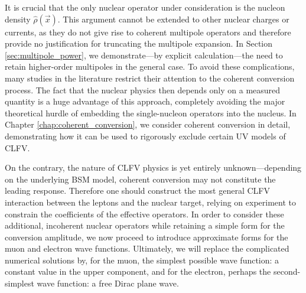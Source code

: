 \documentclass[12pt,letterpaper]{book}
\begin{document}
It is crucial that the only nuclear operator under consideration is the nucleon density $\hat{\rho}(\vec{x})$. This argument cannot be extended to other nuclear charges or currents, as they do not give rise to coherent multipole operators and therefore provide no justification for truncating the multipole expansion. In Section \ref{sec:multipole_power}, we demonstrate---by explicit calculation---the need to retain higher-order multipoles in the general case. To avoid these complications, many studies in the literature restrict their attention to the coherent conversion process. The fact that the nuclear physics then depends only on a measured quantity is a huge advantage of this approach, completely avoiding the major theoretical hurdle of embedding the single-nucleon operators into the nucleus. In Chapter \ref{chap:coherent_conversion}, we consider coherent conversion in detail, demonstrating how it can be used to rigorously exclude certain UV models of CLFV.

On the contrary, the nature of CLFV physics is yet entirely unknown---depending on the underlying BSM model, coherent conversion may not constitute the leading response. Therefore one should construct the most general CLFV interaction between the leptons and the nuclear target, relying on experiment to constrain the coefficients of the effective operators. In order to consider these additional, incoherent nuclear operators while retaining a simple form for the conversion amplitude, we now proceed to introduce approximate forms for the muon and electron wave functions. Ultimately, we will replace the complicated numerical solutions by, for the muon, the simplest possible wave function: a constant value in the upper component, and for the electron, perhaps the second-simplest wave function: a free Dirac plane wave.
 

\end{document}
